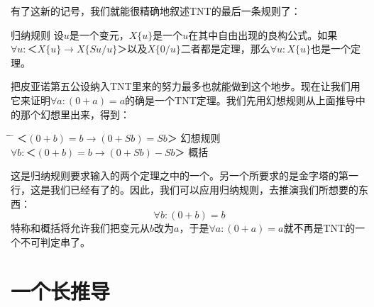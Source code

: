 有了这新的记号，我们就能很精确地叙述TNT的最后一条规则了：
\begin{thm}{归纳规则}
设$u$是一个变元，$X\{u\}$是一个$u$在其中自由出现的良构公式。如果$\forall u:＜X\{u\}→X\{Su/u\}＞$以及$X\{0/u\}$二者都是定理，那么$\forall u:X\{u\}$也是一个定理。
\end{thm}
把皮亚诺第五公设纳入TNT里来的努力最多也就能做到这个地步。现在让我们用它来证明$\forall a:(0+a)=a$的确是一个TNT定理。我们先用幻想规则从上面推导中的那个幻想里出来，得到：
\begin{tabbing*}[]
\qquad\qquad \= \quad \= \tabindent{-2em} \= \+\kill
$＜(0+b)=b→(0+Sb)=Sb＞$ \>           \>幻想规则\\
$\forall b:＜(0+b)=b→(0+Sb)-Sb＞$ \> \> 概括
\end{tabbing*}

这是归纳规则要求输入的两个定理之中的一个。另一个所要求的是金字塔的第一行，这是我们已经有了的。因此，我们可以应用归纳规则，去推演我们所想要的东西：
\[
\forall b:(0+b)=b
\]
特称和概括将允许我们把变元从$b$改为$a$，于是$\forall a:(0+a)=a$就不再是TNT的一个不可判定串了。

\section{一个长推导}

